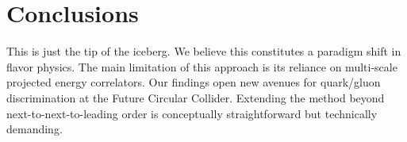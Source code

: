 \section{Conclusions}\label{sec:conclusions}

This is just the tip of the iceberg. We believe this constitutes a
paradigm shift in flavor physics. The main limitation of this approach
is its reliance on multi-scale projected energy correlators. Our
findings open new avenues for quark/gluon discrimination at the Future
Circular Collider. Extending the method beyond next-to-next-to-leading
order is conceptually straightforward but technically demanding.


